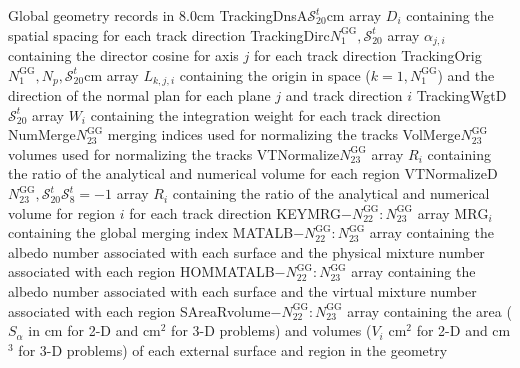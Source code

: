 \begin{DescriptionEnregistrement}{Global geometry records in }{8.0cm}\label{tabl:NXTGlobal}
\DbleEnr
  {TrackingDnsA}{$\mathcal{S}^{t}_{20}$}{cm}
  {array $D_{i}$ containing the spatial spacing for each track direction}
\DbleEnr
  {TrackingDirc}{$N^{\text{GG}}_{1},\mathcal{S}^{t}_{20}$}{}
  {array $\alpha_{j,i}$ containing the director cosine for axis $j$ for each track direction}
\DbleEnr
  {TrackingOrig}{$N^{\text{GG}}_{1},N_{p},\mathcal{S}^{t}_{20}$}{cm}
  {array $L_{k,j,i}$ containing the origin in space ($k=1,N^{\text{GG}}_{1}$) and the direction of the normal plan for each plane $j$ and track direction $i$}
\DbleEnr
  {TrackingWgtD}{$\mathcal{S}^{t}_{20}$}{}
  {array $W_{i}$ containing the integration weight for each track direction}
\IntEnr
  {NumMerge}{$N^{\text{GG}}_{23}$}
  {merging indices used for normalizing the tracks}
\DbleEnr
  {VolMerge}{$N^{\text{GG}}_{23}$}{}
  {volumes used for normalizing the tracks}
\DbleEnr
  {VTNormalize}{$N^{\text{GG}}_{23}$}{}
  {array $R_{i}$ containing the ratio of the analytical and numerical volume for each region}
\OptDbleEnr
  {VTNormalizeD}{$N^{\text{GG}}_{23},\mathcal{S}^{t}_{20}$}{$\mathcal{S}^{t}_{8}=-1$}{}
  {array $R_{i}$ containing the ratio of the analytical and numerical volume for region $i$ for each track direction}
\IntEnr
  {KEYMRG}{$-N^{\text{GG}}_{22}:N^{\text{GG}}_{23}$}
  {array $\text{MRG}_{i}$ containing the global merging index}
\IntEnr
  {MATALB}{$-N^{\text{GG}}_{22}:N^{\text{GG}}_{23}$}
  {array containing the albedo number associated with each surface and the physical mixture number associated with each region}
\IntEnr
  {HOMMATALB}{$-N^{\text{GG}}_{22}:N^{\text{GG}}_{23}$}
  {array containing the albedo number associated with each surface and the virtual mixture number associated with each region}
\DbleEnr
  {SAreaRvolume}{$-N^{\text{GG}}_{22}:N^{\text{GG}}_{23}$}{}
  {array containing the area ($S_{\alpha}$ in cm for 2-D and cm$^{2}$ for 3-D problems) and volumes ($V_{i}$ cm$^{2}$ for 2-D and
cm$^{3}$ for 3-D problems) of each external surface and region in the geometry}
\end{DescriptionEnregistrement}

\clearpage
